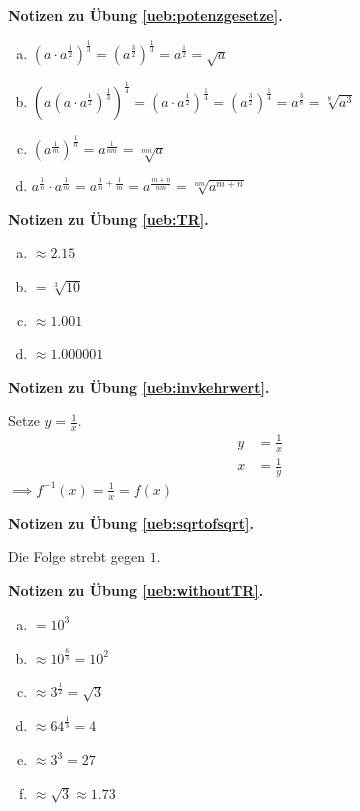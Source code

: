 \documentclass[%
11pt,%
twoside,%
titlepage,%
german,%
headsepline%
]{scrartcl}
\newcommand{\concatueb}[1]{ueb:#1}%
\newcommand{\concatlsg}[1]{lsg:#1}%
\newenvironment{lsg}[1]{%
    \par\noindent\textbf{Notizen zu Übung \ref{\concatueb{#1}}.}%
    \label{\concatlsg{#1}}
}{%
    \par%
}
\begin{document}
\begin{lsg}{potenzgesetze}
    \begin{enumerate}[a)]
      \item $(a\cdot a^\frac{1}{2})^\frac{1}{3}=(a^\frac{3}{2})^\frac{1}{3}=a^\frac{1}{2}=\sqrt{a}$
      \item $(a(a\cdot a^\frac{1}{2})^\frac{1}{3})^\frac{1}{4}=%
      (a\cdot a^\frac{1}{2})^\frac{1}{4}=(a^\frac{3}{2})^\frac{1}{4}=a^\frac{3}{8}=\sqrt[8]{a^3}$
      \item $(a^\frac{1}{m})^\frac{1}{n}=a^\frac{1}{nm}=\sqrt[mn]{a}$
      \item $a^\frac{1}{n}\cdot a^\frac{1}{m}=a^{\frac{1}{n}+\frac{1}{m}}=a^\frac{m+n}{nm}%
      =\sqrt[nm]{a^{m+n}}$
    \end{enumerate}
\end{lsg}

\begin{lsg}{TR}
  \hypertarget{lsg:TR}{}
  \begin{enumerate}[a)]
    \item $\approx2.15$
    \item $=\sqrt[3]{10}$
    \item $\approx1.001$
    \item $\approx1.000001$
  \end{enumerate}
\end{lsg}

\begin{lsg}{invkehrwert}
  Setze $y=\frac{1}{x}$.
  \begin{align*}
    y &= \frac{1}{x}\tag{$\cdot x$, $\div y$}\\
    x &= \frac{1}{y}
  \end{align*}
    $\implies f^{-1}(x)=\frac{1}{x}=f(x)$
\end{lsg}


\begin{lsg}{sqrtofsqrt}
  Die Folge strebt gegen $1$.
\end{lsg}

\begin{lsg}{withoutTR}
  \begin{enumerate}[a)]
    \item $=10^3$
    \item $\approx10^\frac{6}{3}=10^2$
    \item $\approx3^\frac{1}{2}=\sqrt{3}$
    \item $\approx64^\frac{1}{3}=4$
    \item $\approx3^3=27$
    \item $\approx\sqrt{3}\approx1.73$
  \end{enumerate}
\end{lsg}
\end{document}

